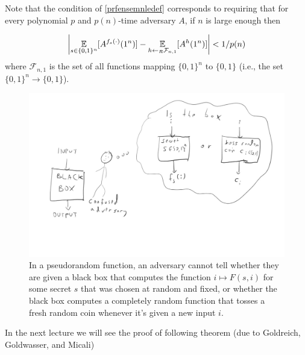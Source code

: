 Note that the condition of \cref{prfensemnledef} corresponds to
requiring that for every polynomial \(p\) and \(p(n)\)-time adversary
\(A\), if \(n\) is large enough then

\begin{equation*}
\left| \operatorname*{\mathbb E}_{s\in\{0,1\}^n}[ A^{f_s(\cdot)}(1^n)] - \operatorname*{\mathbb E}_{h \leftarrow_R \mathcal{F}_{n,1} }[A^h(1^n)] \right| < 1/p(n)
\end{equation*}
where \(\mathcal{F}_{n,1}\) is the set of all functions mapping
\(\{0,1\}^n\) to \(\{0,1\}\) (i.e., the set
\(\{0,1\}^n \rightarrow \{0,1\}\)).


\begin{figure}
\centering
\includegraphics[width=\textwidth, height=0.25\paperheight, keepaspectratio]{../figure/pseudorandom_function.jpg}
\caption{In a pseudorandom function, an adversary cannot tell whether
they are given a black box that computes the function
\(i \mapsto F(s,i)\) for some secret \(s\) that was chosen at random and
fixed, or whether the black box computes a completely random function
that tosses a fresh random coin whenever it's given a new input \(i\).}
\label{prfmodelfig}
\end{figure}

In the next lecture we will see the proof of following theorem (due to
Goldreich, Goldwasser, and Micali)

